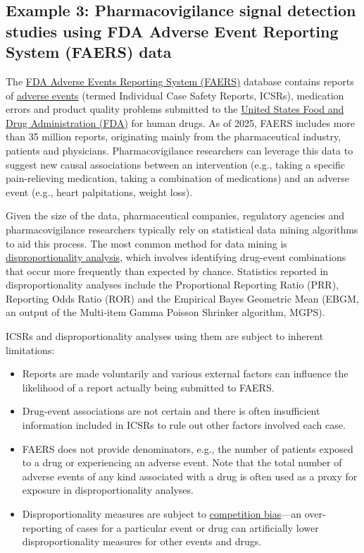 \documentclass[letterpaper, 12pt]{article}
\begin{document}
\subsection*{Example 3: Pharmacovigilance signal detection studies using FDA Adverse Event Reporting System (FAERS) data}

The \href{https://www.fda.gov/drugs/fdas-adverse-event-reporting-system-faers/fda-adverse-event-reporting-system-faers-public-dashboard}{FDA Adverse Events Reporting System (FAERS)} database contains reports of \href{https://en.wikipedia.org/wiki/Adverse_event}{adverse events} (termed Individual Case Safety Reports, ICSRs), medication errors and product quality problems submitted to the \href{https://fda.gov}{United States Food and Drug Administration (FDA)} for human drugs. As of 2025, FAERS includes more than 35 million reports, originating mainly from the pharmaceutical industry, patients and physicians. Pharmacovigilance researchers can leverage this data to suggest new causal associations between an intervention (e.g., taking a specific pain-relieving medication, taking a combination of medications) and an adverse event (e.g., heart palpitations, weight loss).

Given the size of the data, pharmaceutical companies, regulatory agencies and pharmacovigilance researchers typically rely on statistical data mining algorithms to aid this process. The most common method for data mining is \href{https://doi.org/10.1007/s40264-024-01421-9}{disproportionality analysis}, which involves identifying drug-event combinations that occur more frequently than expected by chance. Statistics reported in disproportionality analyses include the Proportional Reporting Ratio (PRR), Reporting Odds Ratio (ROR) and the Empirical Bayes Geometric Mean (EBGM, an output of the Multi-item Gamma Poisson Shrinker algorithm, MGPS).

ICSRs and disproportionality analyses using them are subject to inherent limitations:

\begin{itemize}
    \setlength\itemsep{-0.5em}
    \item Reports are made voluntarily and various external factors can influence the likelihood of a report actually being submitted to FAERS.
    \item Drug-event associations are not certain and there is often insufficient information included in ICSRs to rule out other factors involved each case.
    \item FAERS does not provide denominators, e.g., the number of patients exposed to a drug or experiencing an adverse event. Note that the total number of adverse events of any kind associated with a drug is often used as a proxy for exposure in disproportionality analyses.
    \item Disproportionality measures are subject to \href{https://doi.org/10.1007/s40264-013-0063-5}{competition bias}---an over-reporting of cases for a particular event or drug can artificially lower disproportionality measures for other events and drugs.
\end{itemize}
\end{document}
